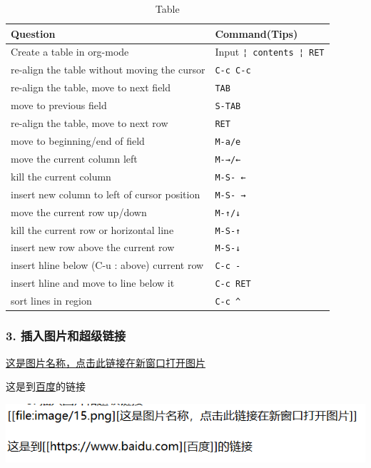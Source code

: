 \documentclass[UTF8]{ctexart}
\begin{document}
\begin{table}[htbp]
\caption{Table}
\centering
\begin{tabular}{ll}
Question & Command(Tips)\\
\hline
Create a table in org-mode & Input \texttt{¦ contents ¦ RET}\\
re-align the table without moving the cursor & \texttt{C-c C-c}\\
re-align the table, move to next field & \texttt{TAB}\\
move to previous field & \texttt{S-TAB}\\
re-align the table, move to next row & \texttt{RET}\\
move to beginning/end of field & \texttt{M-a/e}\\
move the current column left & \texttt{M-→/←}\\
kill the current column & \texttt{M-S- ←}\\
insert new column to left of cursor position & \texttt{M-S- →}\\
move the current row up/down & \texttt{M-↑/↓}\\
kill the current row or horizontal line & \texttt{M-S-↑}\\
insert new row above the current row & \texttt{M-S-↓}\\
insert hline below (C-u : above) current row & \texttt{C-c -}\\
insert hline and move to line below it & \texttt{C-c RET}\\
sort lines in region & \texttt{C-c \textasciicircum{}}\\
\end{tabular}
\end{table}

\subsubsection*{3. 插入图片和超级链接}
\label{sec:orgc211dd4}
\href{image/15.png}{这是图片名称，点击此链接在新窗口打开图片}

这是到\href{https://www.baidu.com}{百度}的链接

\begin{center}
\includegraphics[width=.9\linewidth]{image/15.png}
\end{center}
\end{document}
